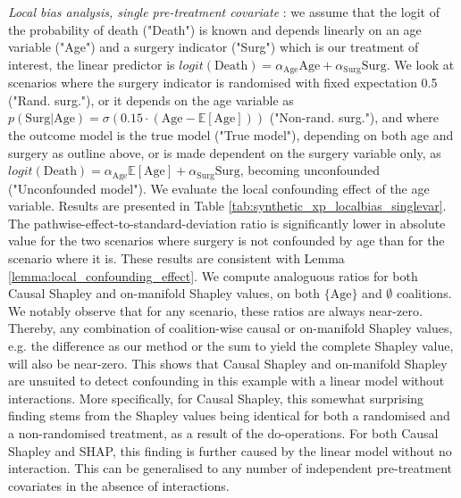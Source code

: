 \documentclass{article}
\theoremstyle{plain}
\theoremstyle{definition}
\theoremstyle{remark}
\theoremstyle{mystyle}
\begin{document}
 \textit{Local bias analysis, single pre-treatment covariate} :  we assume that the logit of the probability of death ("Death") is known and depends linearly on an age variable ("Age") and a surgery indicator ("Surg") which is our treatment of interest, the linear predictor is $logit(\text{Death}) = \alpha_\text{Age} \text{Age} + \alpha_\text{Surg} \text{Surg}$. We look at scenarios where the surgery indicator is randomised with fixed expectation 0.5 ("Rand. surg."), or it depends on the age variable as $p(\text{Surg} | \text{Age}) = \sigma(0.15 \cdot (\text{Age} - \mathbb{E}[\text{Age}]))$ ("Non-rand. surg."), and where the outcome model is the true model ("True model"), depending on both age and surgery as outline above, or is made dependent on the surgery variable only, as $logit(\text{Death}) = \alpha_\text{Age} \mathbb{E}[\text{Age}] + \alpha_\text{Surg} \text{Surg}$, becoming unconfounded ("Unconfounded model"). We evaluate the local confounding effect of the age variable. Results are presented in Table \ref{tab:synthetic_xp_localbias_singlevar}. The pathwise-effect-to-standard-deviation ratio is significantly lower in absolute value for the two scenarios where surgery is not confounded by age than for the scenario where it is. These results are consistent with Lemma \ref{lemma:local_confounding_effect}. We compute analoguous ratios for both Causal Shapley and on-manifold Shapley values, on both $\{\text{Age}\}$ and $\emptyset$ coalitions. We notably observe that for any scenario, these ratios are always near-zero. Thereby, any combination of coalition-wise causal or on-manifold Shapley values, e.g. the difference as our method or the sum to yield the complete Shapley value, will also be near-zero. This shows that Causal Shapley and on-manifold Shapley are unsuited to detect confounding in this example with a linear model without interactions. More specifically, for Causal Shapley, this somewhat surprising finding stems from the Shapley values being identical for both a randomised and a non-randomised treatment, as a result of the do-operations. For both Causal Shapley and SHAP, this finding is further caused by the linear model without no interaction. This can be generalised to any number of independent pre-treatment covariates in the absence of interactions. 
    
\end{document}
